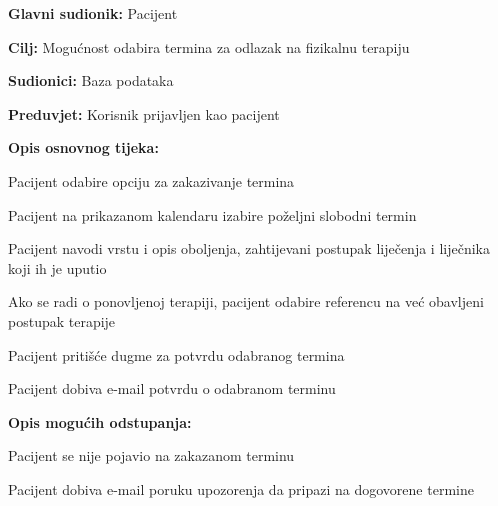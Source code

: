 					\noindent {}
					\begin{packed_item}
						
						\item \textbf{Glavni sudionik: }Pacijent
						\item  \textbf{Cilj:} Mogućnost odabira termina za odlazak na fizikalnu terapiju
						\item  \textbf{Sudionici:} Baza podataka
						\item  \textbf{Preduvjet:} Korisnik prijavljen kao pacijent
						\item  \textbf{Opis osnovnog tijeka:}
						
						\item[] \begin{packed_enum}
							
							\item Pacijent odabire opciju za zakazivanje termina
							\item Pacijent na prikazanom kalendaru izabire poželjni slobodni termin
							\item Pacijent navodi vrstu i opis oboljenja, zahtijevani postupak liječenja i liječnika koji ih je uputio
							\item Ako se radi o ponovljenoj terapiji, pacijent odabire referencu na već obavljeni postupak terapije
							\item Pacijent pritišće dugme za potvrdu odabranog termina
							\item Pacijent dobiva e-mail potvrdu o odabranom terminu
						\end{packed_enum}
						
						\item  \textbf{Opis mogućih odstupanja:}
						
						\item[] \begin{packed_item}
							
							\item[2.a] Pacijent se nije pojavio na zakazanom terminu
							\item[] \begin{packed_enum}
								
								\item Pacijent dobiva e-mail poruku upozorenja da pripazi na dogovorene termine
								
							\end{packed_enum}
							
							
						\end{packed_item}
					\end{packed_item}
					

